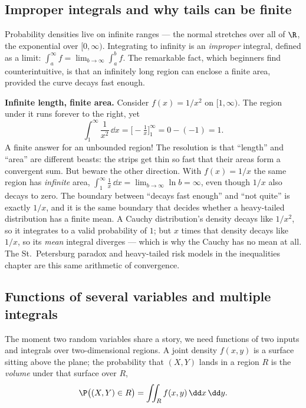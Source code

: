 \subsection{Improper integrals and why tails can be finite}
\label{chAcla:improper}

Probability densities live on infinite ranges --- the normal stretches over all of $\R$, the
exponential over $[0,\infty)$. Integrating to infinity is an \emph{improper} integral, defined as a
limit: $\int_a^\infty f = \lim_{b\to\infty}\int_a^b f$. The remarkable fact, which beginners find
counterintuitive, is that an infinitely long region can enclose a finite area, provided the curve
decays fast enough.

\begin{paradoxbox}
\textbf{Infinite length, finite area.} Consider $f(x)=1/x^2$ on $[1,\infty)$. The region under it
runs forever to the right, yet
\[
  \int_1^\infty \frac{1}{x^2}\,\dd x = \Big[-\tfrac1x\Big]_1^\infty = 0-(-1) = 1.
\]
A finite answer for an unbounded region! The resolution is that ``length'' and ``area'' are different
beasts: the strips get thin so fast that their areas form a convergent sum. But beware the other
direction. With $f(x)=1/x$ the same region has \emph{infinite} area, $\int_1^\infty \frac1x\,\dd x =
\lim_{b\to\infty}\ln b = \infty$, even though $1/x$ also decays to zero. The boundary between ``decays
fast enough'' and ``not quite'' is exactly $1/x$, and it is the same boundary that decides whether a
heavy-tailed distribution has a finite mean. A Cauchy distribution's density decays like $1/x^2$, so
it integrates to a valid probability of $1$; but $x$ times that density decays like $1/x$, so its
\emph{mean} integral diverges --- which is why the Cauchy has no mean at all. The St.\ Petersburg
paradox and heavy-tailed risk models in the inequalities chapter are this same arithmetic of
convergence.
\end{paradoxbox}

\subsection{Functions of several variables and multiple integrals}
\label{chAcla:multiple-integrals}

The moment two random variables share a story, we need functions of two inputs and integrals over
two-dimensional regions. A joint density $f(x,y)$ is a surface sitting above the plane; the
probability that $(X,Y)$ lands in a region $R$ is the \emph{volume} under that surface over $R$,
\[
  \P\big((X,Y)\in R\big) = \iint_R f(x,y)\,\dd x\,\dd y.
\]

